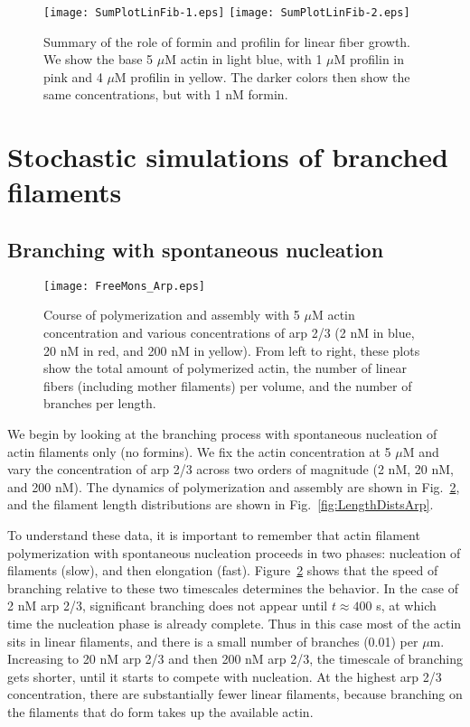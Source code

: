 \documentclass[11pt]{article}
\begin{document}
\begin{figure}
\centering
\texttt{[image: SumPlotLinFib-1.eps]}
\texttt{[image: SumPlotLinFib-2.eps]}
\caption{\label{fig:SumPlotLin}Summary of the role of formin and profilin for linear fiber growth. We show the base 5 $\mu$M actin in light blue, with 1 $\mu$M profilin in pink and 4 $\mu$M profilin in yellow. The darker colors then show the same concentrations, but with 1 nM formin.}
\end{figure}

\section{Stochastic simulations of branched filaments \label{sec:BF}}

\subsection{Branching with spontaneous nucleation \label{sec:BrSN}}

\begin{figure}
\centering
\texttt{[image: FreeMons\_Arp.eps]}
\caption{\label{fig:PolyDynamicsArp}Course of polymerization and assembly with 5 $\mu$M actin concentration and various concentrations of arp 2/3 (2 nM in blue, 20 nM in red, and 200 nM in yellow). From left to right, these plots show the total amount of polymerized actin, the number of linear fibers (including mother filaments) per volume, and the number of branches per length. }
\end{figure}

We begin by looking at the branching process with spontaneous nucleation of actin filaments only (no formins). We fix the actin concentration at 5 $\mu$M and vary the concentration of arp 2/3 across two orders of magnitude (2 nM, 20 nM, and 200 nM). The dynamics of polymerization and assembly are shown in Fig.\ \ref{fig:PolyDynamicsArp}, and the filament length distributions are shown in Fig.\ \ref{fig:LengthDistsArp}. 

To understand these data, it is important to remember that actin filament polymerization with spontaneous nucleation proceeds in two phases: nucleation of filaments (slow), and then elongation (fast). Figure\ \ref{fig:PolyDynamicsArp} shows that the speed of branching relative to these two timescales determines the behavior. In the case of 2 nM arp 2/3, significant branching does not appear until $t \approx 400$ s, at which time the nucleation phase is already complete. Thus in this case most of the actin sits in linear filaments, and there is a small number of branches (0.01) per $\mu$m. Increasing to 20 nM arp 2/3 and then 200 nM arp 2/3, the timescale of branching gets shorter, until it starts to compete with nucleation. At the highest arp 2/3 concentration, there are substantially fewer linear filaments, because branching on the filaments that do form takes up the available actin.
\end{document}
